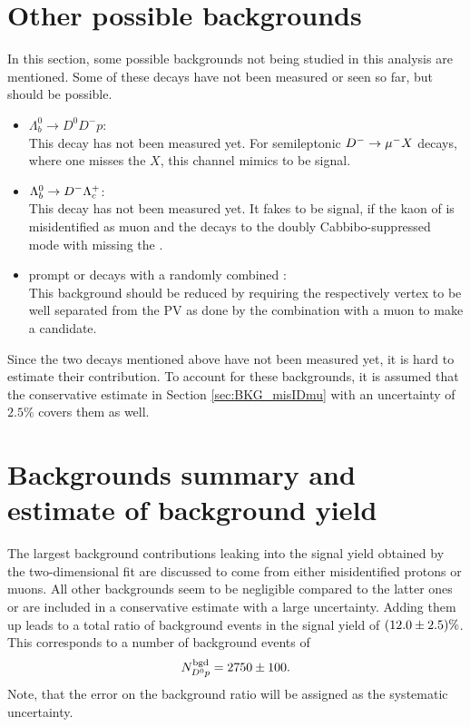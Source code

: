 \section{Other possible backgrounds}
In this section, some possible backgrounds not being studied in this analysis are mentioned.
Some of these decays have not been measured or seen so far, but should be possible.
\begin{itemize}
    \item $\Lambda_b^0 \rightarrow D^0 D^- p$: \\
          This decay has not been measured yet.
          For semileptonic ${{D}^-} \rightarrow {\ensuremath{\mu^-}} X$ decays, where one misses the $X$, this channel mimics to be \LbToDpmunuX signal.
    \item $\Lambda_b^0 \rightarrow {\ensuremath{{D}^-}} {\ensuremath{{\Lambda}^+_{c}}}$: \\
          This decay has not been measured yet.
          It fakes to be signal, if the kaon of \LcTopKpi is misidentified as muon and the \Dm decays to the doubly Cabbibo-suppressed mode \decay{\Dm}{\Km\piz} with missing the \piz.
    \item prompt \LcResI or \LcResII decays with a randomly combined \mun: \\
          This background should be reduced by requiring the \LcResI respectively \LcResII vertex to be well separated from the PV as done by the combination with a muon to make a \Lb candidate.
\end{itemize}
Since the two \Lb decays mentioned above have not been measured yet, it is hard to estimate their contribution.
To account for these backgrounds, it is assumed that the conservative estimate in Section \ref{sec:BKG_misIDmu} with an uncertainty of $2.5\%$ covers them as well.

\section{Backgrounds summary and estimate of background yield}
The largest background contributions leaking into the signal yield \NDp obtained by the two-dimensional fit are discussed to come from either misidentified protons or muons.
All other backgrounds seem to be negligible compared to the latter ones or are included in a conservative estimate with a large uncertainty.
Adding them up leads to a total ratio of background events in the signal yield of $(12.0 \pm 2.5)\%$.
This corresponds to a number of background events of 
\begin{align*}
    N^{\rm bgd}_{{{D}^0}{p}} = 2750 \pm 100.
\end{align*}
Note, that the error on the background ratio will be assigned as the systematic uncertainty.

